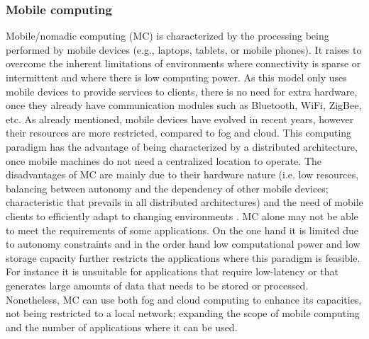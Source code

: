 \subsubsection{Mobile computing}\label{subsec:MC}
Mobile/nomadic computing (MC) is characterized by the processing being performed by mobile devices (e.g., laptops, tablets, or mobile phones). It raises to overcome the inherent limitations of environments where connectivity is sparse or intermittent and where there is low computing power. As this model only uses mobile devices to provide services to clients, there is no need for extra hardware, once they already have communication modules such as Bluetooth, WiFi, ZigBee, etc. As already mentioned, mobile devices have evolved in recent years, however their resources are more restricted, compared to fog and cloud. This computing paradigm has the advantage of being characterized by a distributed architecture, once mobile machines do not need a centralized location to operate. The disadvantages of MC are mainly due to their hardware nature (i.e. low resources, balancing between autonomy and the dependency of other mobile devices; characteristic that prevails in all distributed architectures) and the need of mobile clients to efficiently adapt to changing environments \cite{satyanarayanan1996fundamental}. MC alone may not be able to meet the requirements of some applications. On the one hand it is limited due to autonomy constraints and in the order hand low computational power and low storage capacity further restricts the applications where this paradigm is feasible. For instance it is unsuitable for applications that require low-latency or that generates large amounts of data that needs to be stored or processed. Nonetheless, MC can use both fog and cloud computing to enhance its capacities, not being restricted to a local network; expanding the scope of mobile computing and the number of applications where it can be used.\vfill\pagebreak

